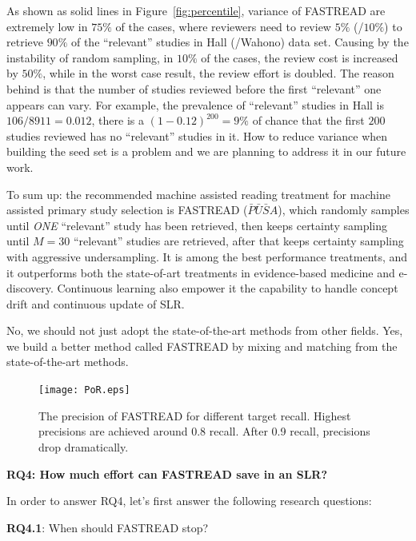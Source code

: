 \documentclass[final,twocolumn,5p]{elsarticle}
\theoremstyle{break}
\begin{document}
As shown as solid lines in Figure~\ref{fig:percentile}, variance of FASTREAD are extremely low in $75\%$ of the cases, where reviewers need to review $5\%$ (/$10\%$) to retrieve $90\%$ of the ``relevant'' studies in Hall (/Wahono) data set. Causing by the instability of random sampling, in $10\%$ of the cases, the review cost is increased by $50\%$, while in the worst case result, the review effort is doubled. The reason behind is that the number of studies reviewed before the first ``relevant'' one appears can vary. For example, the prevalence of ``relevant'' studies in Hall is $106/8911=0.012$, there is a $(1-0.12)^{200}=9\%$ of chance that the first $200$ studies reviewed has no ``relevant'' studies in it. How to reduce variance when building the seed set is a problem and we are planning to address it in our future work.

To sum up: the recommended machine assisted reading treatment for machine assisted primary study selection is FASTREAD ($\bar{P}\bar{U}\bar{S}A$), which randomly samples until {\em ONE}
``relevant'' study has been retrieved, then keeps certainty sampling until $M=30$ ``relevant'' studies are retrieved, after that keeps certainty sampling with aggressive undersampling. It is among the best performance treatments, and it outperforms both the state-of-art treatments in evidence-based medicine and e-discovery. Continuous learning also empower it the capability to handle concept drift and continuous update of SLR. 

\begin{lesson}
    No, we should not just adopt the state-of-the-art methods from other fields. Yes, we build a better method called FASTREAD by mixing and matching from the state-of-the-art methods.
\end{lesson}

\begin{figure}[th]
    \centering
    \texttt{[image: PoR.eps]}
    \caption{The precision of FASTREAD for different target recall. Highest precisions are achieved around 0.8 recall. After 0.9 recall, precisions drop dramatically.}
    \label{fig:precision}
\end{figure}



\textbf{RQ4: How much effort can FASTREAD save in an SLR?}

In order to answer RQ4, let's first answer the following research questions:

\textbf{RQ4.1}: When should FASTREAD stop?
\end{document}
